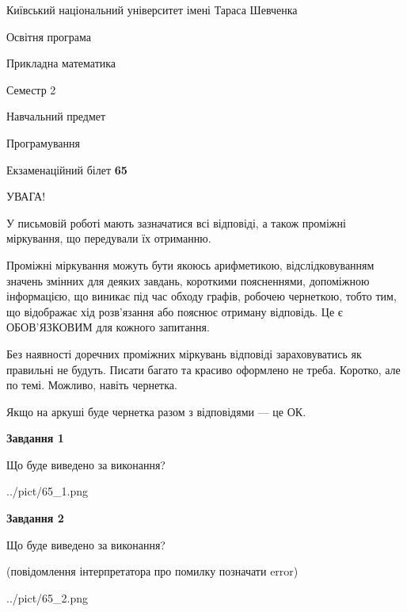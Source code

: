 \documentclass[12pt, ukrainian]{article}
\begin{document}
{{\begin {small}\par
{ \center  Київський національний університет імені Тараса Шевченка \par}
{\parbox {5 cm}{Освітня програма \hfill}{\parbox {7 cm}{Прикладна математика\hfill}}\parbox {6 cm}{\hfill Семестр 2}}\par
{\parbox {5 cm} {Навчальний предмет \hfill}\parbox {7 cm}{Програмування \hfill}\parbox {6cm}{\hfill}\par}\vspace{-7pt} \end{small}}{\center Екзаменаційний білет \No \textbf
{ 65 }\par}}
{
\begin {large}
УВАГА!

У письмовій роботі мають зазначатися всі відповіді, а також проміжні міркування, що передували їх отриманню.

Проміжні міркування можуть бути якоюсь арифметикою, відслідковуванням зна\-чень змінних для деяких завдань,
короткими поясненнями, допоміжною інформацією, що виникає під час обходу графів, робочею чернеткою,
тобто тим, що відображає хід розв’язання або пояснює отриману відповідь.
Це є ОБОВ’ЯЗКОВИМ для кожного запитання.

Без наявності доречних проміжних міркувань відповіді зараховуватись як правиль\-ні не будуть.
Писати багато та красиво оформлено не треба. Коротко, але по темі. Можли\-во, навіть чернетка.

Якщо на аркуші буде чернетка разом з відповідями --- це ОК.

\newpage

{\begin {center}\textbf{Завдання 1}\end {center}}\par
Що буде виведено за виконання?\par
\begin{center}
	{../pict/65_1.png}
\end{center}
\newpage

{\begin {center}\textbf{Завдання 2}\end {center}}\par
Що буде виведено за виконання?\par
 (повідомлення інтерпретатора про помилку позначати error)\par
\begin{center}
	{../pict/65_2.png}
\end{center}
\newpage


\end{large}}
\end{document}
